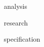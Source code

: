 \documentclass[12pt]{report}
\begin{document}




\newpage
\tableofcontents

\newpage
\listoffigures

\newpage
\listoftables

{analysis}

{research}

{specification}





\end{document}
